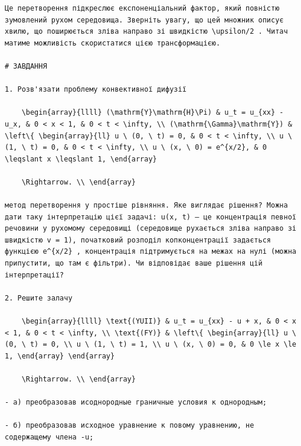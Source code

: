 \documentclass[
  ukrainian,
]{article}
\begin{document}
\begin{verbatim}
Це перетворення підкреслює експоненціальний фактор, який повністю зумовлений рухом середовища. Зверніть увагу, що цей множник описує хвилю, що поширюється зліва направо зі швидкістю \upsilon/2 . Читач матиме можливість скористатися цією трансформацією.

# ЗАВДАННЯ

1. Розв'язати проблему конвективної дифузії

    \begin{array}{llll} (\mathrm{Y}\mathrm{H}\Pi) & u_t = u_{xx} - u_x, & 0 < x < 1, & 0 < t < \infty, \\ (\mathrm{\Gamma}\mathrm{Y}) & \left\{ \begin{array}{ll} u \ (0, \ t) = 0, & 0 < t < \infty, \\ u \ (1, \ t) = 0, & 0 < t < \infty, \\ u \ (x, \ 0) = e^{x/2}, & 0 \leqslant x \leqslant 1, \end{array}

    \Rightarrow. \\ \end{array}

метод перетворення у простіше рівняння. Яке виглядає рішення? Можна дати таку інтерпретацію цієї задачі: u(x, t) — це концентрація певної речовини у рухомому середовищі (середовище рухається зліва направо зі швидкістю v = 1), початковий розподіл копконцентрації задається функцією e^{x/2} , концентрація підтримується на межах на нулі (можна припустити, що там є фільтри). Чи відповідає ваше рішення цій інтерпретації?

2. Решите залачу

    \begin{array}{llll} \text{(YUII)} & u_t = u_{xx} - u + x, & 0 < x < 1, & 0 < t < \infty, \\ \text{(FY)} & \left\{ \begin{array}{ll} u \ (0, \ t) = 0, \\ u \ (1, \ t) = 1, \\ u \ (x, \ 0) = 0, & 0 \le x \le 1, \end{array} \end{array}

    \Rightarrow. \\ \end{array}

- а) преобразовав исоднородные граничные условия к однородным;

- б) преобразовав исходное уравнение к повому уравнению, не содержащему члена -u;


\end{verbatim}
\end{document}
